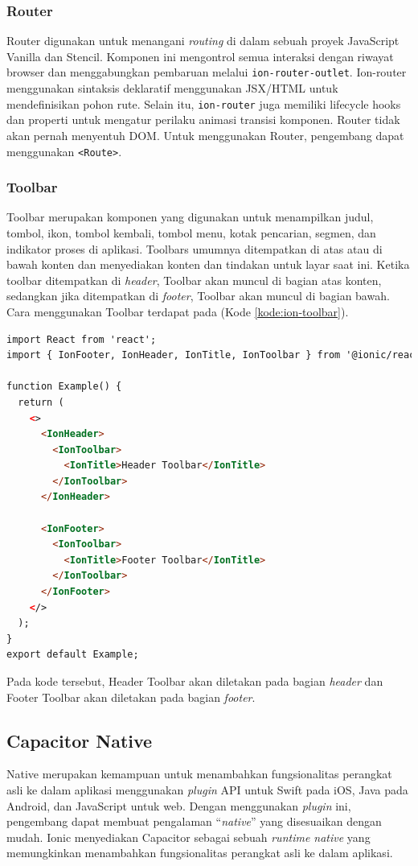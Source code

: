 \subsubsection{Router}
\label{subbab:router}
Router digunakan untuk menangani \textit{routing} di dalam sebuah proyek JavaScript Vanilla dan Stencil. Komponen ini mengontrol semua interaksi dengan riwayat browser dan menggabungkan pembaruan melalui \texttt{ion-router-outlet}. Ion-router menggunakan sintaksis deklaratif menggunakan JSX/HTML untuk mendefinisikan pohon rute. Selain itu, \texttt{ion-router} juga memiliki lifecycle hooks dan properti untuk mengatur perilaku animasi transisi komponen. Router tidak akan pernah menyentuh DOM. Untuk menggunakan Router, pengembang dapat menggunakan \texttt{<Route>}.

\subsubsection{Toolbar}
Toolbar merupakan komponen yang digunakan untuk menampilkan judul, tombol, ikon, tombol kembali, tombol menu, kotak pencarian, segmen, dan indikator proses di aplikasi. Toolbars umumnya ditempatkan di atas atau di bawah konten dan menyediakan konten dan tindakan untuk layar saat ini. Ketika toolbar ditempatkan di \textit{header}, Toolbar akan muncul di bagian atas konten, sedangkan jika ditempatkan di \textit{footer}, Toolbar akan muncul di bagian bawah. Cara menggunakan Toolbar terdapat pada (Kode \ref{kode:ion-toolbar}).

\begin{lstlisting}[language=HTML, caption=Contoh Kode Penggunaan Toolbar, label=kode:ion-toolbar]
import React from 'react';
import { IonFooter, IonHeader, IonTitle, IonToolbar } from '@ionic/react';

function Example() {
  return (
    <>
      <IonHeader>
        <IonToolbar>
          <IonTitle>Header Toolbar</IonTitle>
        </IonToolbar>
      </IonHeader>

      <IonFooter>
        <IonToolbar>
          <IonTitle>Footer Toolbar</IonTitle>
        </IonToolbar>
      </IonFooter>
    </>
  );
}
export default Example;
\end{lstlisting}

Pada kode tersebut, Header Toolbar akan diletakan pada bagian \textit{header} dan Footer Toolbar akan diletakan pada bagian \textit{footer}. 

\subsection{Capacitor Native}
Native merupakan kemampuan untuk menambahkan fungsionalitas perangkat asli ke dalam aplikasi menggunakan \textit{plugin} API untuk Swift pada iOS, Java pada Android, dan JavaScript untuk web. Dengan menggunakan \textit{plugin} ini, pengembang dapat membuat pengalaman ``\textit{native}'' yang disesuaikan dengan mudah. Ionic menyediakan Capacitor sebagai sebuah \textit{runtime native} yang memungkinkan menambahkan fungsionalitas perangkat asli ke dalam aplikasi.

